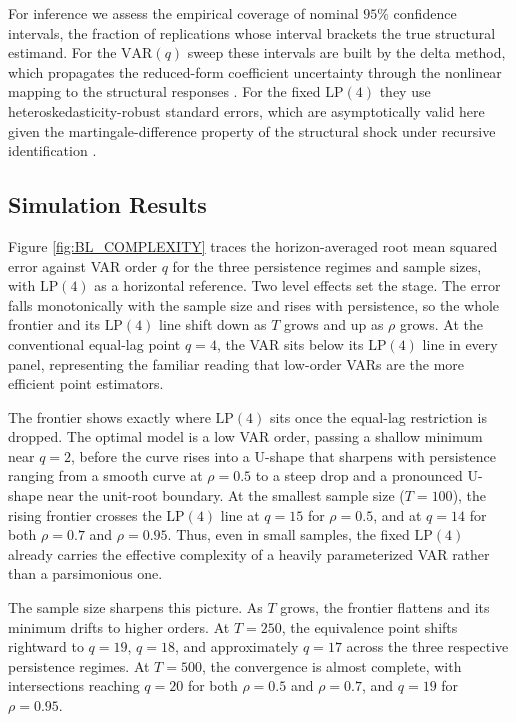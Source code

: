 For inference we assess the empirical coverage of nominal $95\%$ confidence intervals, the 
fraction of replications whose interval brackets the true structural estimand. For the 
$\text{VAR}(q)$ sweep these intervals are built by the delta method, which propagates the 
reduced-form coefficient uncertainty through the nonlinear mapping to the structural responses 
\parencite{kilian2017structural}. For the fixed $\text{LP}(4)$ they use heteroskedasticity-robust 
standard errors, which are asymptotically valid here given the martingale-difference property of 
the structural shock under recursive identification \parencite{plagborg2021local}.



\subsection{Simulation Results}

Figure \ref{fig:BL_COMPLEXITY} traces the horizon-averaged root mean squared error against VAR order $q$ for the three persistence regimes and sample sizes, with $\text{LP}(4)$ as a horizontal reference. Two level effects set the stage. The error falls monotonically with the sample size and rises with persistence, so the whole frontier and its $\text{LP}(4)$ line shift down as $T$ grows and up as $\rho$ grows. At the conventional equal-lag point $q=4$, the VAR sits below its $\text{LP}(4)$ line in every panel, representing the familiar reading that low-order VARs are the more efficient point estimators.

The frontier shows exactly where $\text{LP}(4)$ sits once the equal-lag restriction is dropped. The optimal model is a low VAR order, passing a shallow minimum near $q=2$, before the curve rises into a U-shape that sharpens with persistence ranging from a smooth curve at $\rho=0.5$ to a steep drop and a pronounced U-shape near the unit-root boundary. At the smallest sample size ($T=100$), the rising frontier crosses the $\text{LP}(4)$ line at $q=15$ for $\rho=0.5$, and at $q=14$ for both $\rho=0.7$ and $\rho=0.95$. Thus, even in small samples, the fixed $\text{LP}(4)$ already carries the effective complexity of a heavily parameterized VAR rather than a parsimonious one.

The sample size sharpens this picture. As $T$ grows, the frontier flattens and its minimum drifts to higher orders. At $T=250$, the equivalence point shifts rightward to $q=19$, $q=18$, and approximately $q=17$ across the three respective persistence regimes. At $T=500$, the convergence is almost complete, with intersections reaching $q=20$ for both $\rho=0.5$ and $\rho=0.7$, and $q=19$ for $\rho=0.95$. 

